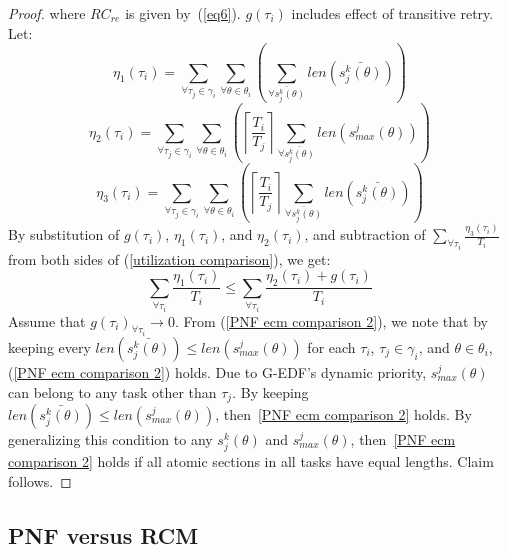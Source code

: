 \documentclass[12pt,english]{report}
\newtheorem{proof}{Proof}
\begin{document}
\begin{proof}
%
where $RC_{re}$ is given by~(\ref{eq6}). $g(\tau_i)$ includes effect of transitive retry. Let:
%
\begin{equation*}
\eta_{1}(\tau_{i})=\sum_{\forall\tau_{j}\in\gamma_{i}}\sum_{\forall\theta\in\theta_{i}}\left(\sum_{\bar{\forall s_{j}^{k}(\theta)}}len\left(\bar{s_{j}^{k}(\theta)}\right)\right)
\end{equation*}
%
\begin{equation*}
\eta_{2}(\tau_{i})=\sum_{\forall\tau_{j}\in\gamma_{i}}\sum_{\forall\theta\in\theta_{i}}\left(\left\lceil \frac{T_{i}}{T_{j}}\right\rceil \sum_{\forall\bar{s_{j}^{k}(\theta)}}len\left(s_{max}^{j}(\theta)\right)\right)
\end{equation*}
%
%
\begin{equation*}
\eta_{3}(\tau_{i})=\sum_{\forall\tau_{j}\in\gamma_{i}}\sum_{\forall\theta\in\theta_{i}}\left(\left\lceil \frac{T_{i}}{T_{j}}\right\rceil \sum_{\bar{\forall s_{j}^{k}(\theta)}}len\left(\bar{s_{j}^{k}(\theta)}\right)\right)
\end{equation*}
%
By substitution of $g(\tau_{i})$, $\eta_1(\tau_i)$, and $\eta_2(\tau_i)$, and subtraction of $\sum_{\forall \tau_i} \frac{\eta_3(\tau_i)}{T_i}$ from both sides of (\ref{utilization comparison}), we get: 
\begin{equation}
\sum_{\forall \tau_i} \frac{\eta_1(\tau_i)}{T_i} \le \sum_{\forall \tau_i} \frac{\eta_2(\tau_i)+g(\tau_i)}{T_i}
\label{PNF ecm comparison 2}
\end{equation}
Assume that $g(\tau_{i})_{\forall\tau_{i}}\rightarrow0$. From (\ref{PNF ecm comparison 2}), we note that by keeping
every $len(\bar{s_{j}^{k}(\theta)})\le len(s_{max}^{j}(\theta))$
for each $\tau_{i}$, $\tau_{j}\in\gamma_{i}$, and $\theta\in\theta_{i}$,  (\ref{PNF ecm comparison 2}) holds. 
%
Due to G-EDF's dynamic priority, $s_{max}^{j}(\theta)$
can belong to any task other than $\tau_{j}$. By keeping $len(\bar{s_j^k(\theta)})\le len(s_{max}^j(\theta))$, then~\ref{PNF ecm comparison 2} holds. By generalizing this condition to any $s_j^k(\theta)$ and $s_{max}^j(\theta)$, then~\ref{PNF ecm comparison 2} holds if all atomic sections in all tasks have equal lengths. Claim follows.
\end{proof}

\subsection{PNF versus RCM}\label{pnf vs rcm sec}
\end{document}
